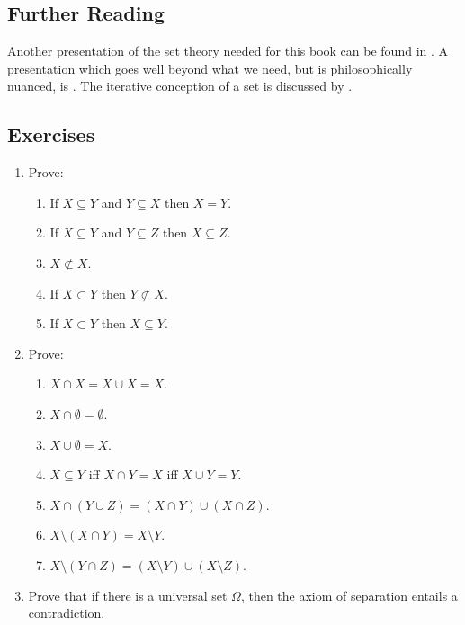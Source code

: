{\small
\subsection*{Further Reading}


Another presentation of the set theory needed for this book can be found in
 \citet{bevpospa}. A presentation which goes well beyond what we need, but is philosophically nuanced, is
 \citet{potsetthi}. The iterative conception of a set is discussed by \citet{boolos}.



\subsection*{Exercises} \label{ex:sets}

\begin{enumerate}

\item Prove: \begin{enumerate}
	\item If $X \subseteq Y$ and $Y \subseteq X$ then $X=Y$.
	\item If $X \subseteq Y$ and $Y \subseteq Z$ then $X \subseteq Z$.
	\item $X \not\subset X$.
	\item If $X \subset Y$ then $Y \not\subset X$.
	\item If $X \subset Y$ then $X \subseteq Y$.
\end{enumerate}

\item Prove: \begin{enumerate}
	\item $X\cap X=X\cup X=X$.
	\item $X \cap \emptyset = \emptyset$.
	\item $X \cup \emptyset = X$.
	\item $X \subseteq Y$ iff $X \cap Y = X$ iff $X \cup Y = Y$.
	\item $X \cap (Y \cup Z) = (X \cap Y) \cup (X \cap Z)$.
	\item $X\setminus (X \cap Y) = X\setminus Y$.
	\item $X \setminus (Y \cap Z) = (X\setminus Y)\cup(X\setminus Z)$.
\end{enumerate}

\item Prove that if there is a universal set $\Omega$, then the axiom of separation entails a contradiction.


\end{enumerate}}
